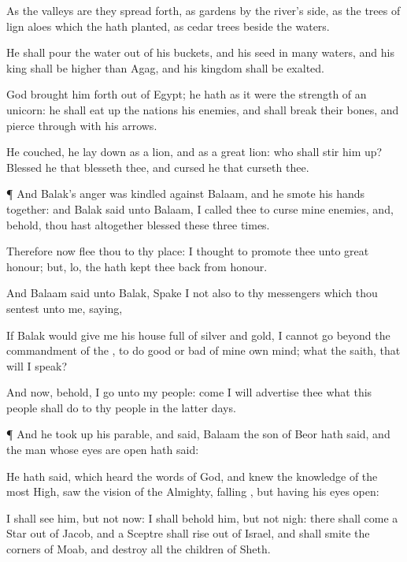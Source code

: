 {As the
valleys are they spread
forth, as
gardens by the
river’s side, as the trees of lign
aloes which the
{} hath
planted,
{} as cedar
trees beside the
waters.

He shall
pour the
water
out of his
buckets, and his
seed
{} in
many
waters, and his
king shall be
higher than
Agag, and his
kingdom shall be
exalted.

God brought him
forth out of
Egypt; he hath as it were the
strength of an
unicorn: he shall eat
up the
nations his
enemies, and shall
break their
bones, and
pierce
{} through with his
arrows.

He
couched, he lay
down as a
lion, and as a great
lion: who shall stir him
up?
Blessed
{} he that
blesseth thee, and
cursed
{} he that
curseth thee.


\par }{\PP {}¶ And
Balak’s
anger was
kindled against
Balaam, and he
smote his
hands
together: and
Balak
said unto
Balaam, I
called thee to
curse mine
enemies, and, behold, thou hast
altogether
blessed
{} these
three
times.

Therefore now
flee thou to thy
place: I
thought to
promote thee unto
great
honour; but, lo, the
{} hath kept thee
back from
honour.

And
Balaam
said unto
Balak,
Spake I not also to thy
messengers which thou
sentest unto me,
saying,

If
Balak would
give me his
house
full of
silver and
gold, I
cannot go
beyond the
commandment of the
{}, to
do
{}
good or
bad of mine own
mind;
{} what the
{}
saith, that will I
speak?

And now, behold, I
go unto my
people:
come
{} I will
advertise thee what this
people shall
do to thy
people in the
latter
days.


\par }{\PP {}¶ And he took
up his
parable, and
said,
Balaam the
son of
Beor hath
said, and the
man whose
eyes are
open hath
said:

He hath
said, which
heard the
words of
God, and
knew the
knowledge of the most
High,
{}
saw the
vision of the
Almighty,
falling
{}, but having his
eyes
open:

I shall
see him, but not now: I shall
behold him, but not
nigh: there shall
come a
Star out of
Jacob, and a
Sceptre shall
rise out of
Israel, and shall
smite the
corners of
Moab, and
destroy all the
children of
Sheth.

}
